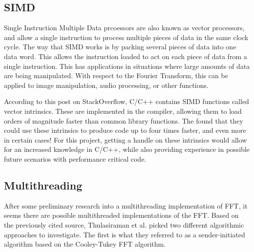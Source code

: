 \documentclass[12pt]{extarticle}
\begin{document}
\subsection*{SIMD}
    
    Single Instruction Multiple Data prcoessors are also known as vector processors, and allow a single instruction
    to process multiple pieces of data in the same clock cycle. The way that SIMD works is by packing several pieces of data
    into one data word. This allows the instruction loaded to act on each piece of data from a single instruction.
    This has applications in situations where large amounts of data are being manipulated. With respect to the Fourier Transform,
    this can be applied to image manipulation, audio processing, or other functions.

    According to this post\cite{Konstantin:2020} on StackOverflow, C/C++ contains SIMD functions called vector intrinsics.
    These are implemented in the compiler, allowing them to load orders of magnitude faster than common library functions. 
    The found that they could use these intrinsics to produce code up to four times faster, and even more in certain cases!
    For this project, getting a handle on these intrinsics would allow for an increased knowledge in C/C++, while also providing
    experience in possible future scenarios with performance critical code.

\subsection*{Multithreading}
    After some preliminary research into a multithreading implementation of FFT\cite{Thulasiraman:2021}, it seems there are
    possible multithreaded implementations of the FFT. Based on the previously cited source, Thulasiraman et al. picked two 
    different algorithmic approaches to investigate. The first is what they referred to as a sender-initiated algorithm based
    on the Cooley-Tukey FFT algorithm.


\end{document}
